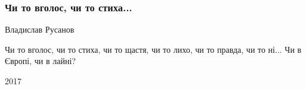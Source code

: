  
 
 

\subsubsection{Чи то вголос, чи то стиха...}

Владислав Русанов

Чи то вголос, чи то стиха,
чи то щастя, чи то лихо,
чи то правда, чи то ні...
Чи в Європі, чи в лайні?

2017 
